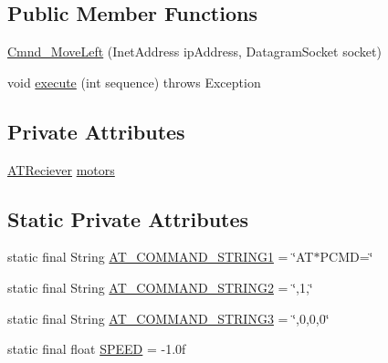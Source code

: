 \subsection*{Public Member Functions}
\begin{DoxyCompactItemize}
\item 
\hyperlink{class_drone_1_1_drone_commands_1_1_cmnd___move_left_a121e1828767507bd3bebaed017e5f4bf}{Cmnd\+\_\+\+Move\+Left} (Inet\+Address ip\+Address, Datagram\+Socket socket)
\item 
void \hyperlink{class_drone_1_1_drone_commands_1_1_cmnd___move_left_afdc1e84570cf60478378f67069e89182}{execute} (int sequence)  throws Exception  	
\end{DoxyCompactItemize}
\subsection*{Private Attributes}
\begin{DoxyCompactItemize}
\item 
\hyperlink{class_drone_1_1_hardware_1_1_a_t_reciever}{A\+T\+Reciever} \hyperlink{class_drone_1_1_drone_commands_1_1_cmnd___move_left_a2492b3f8b7d40f172fcde81705d96547}{motors}
\end{DoxyCompactItemize}
\subsection*{Static Private Attributes}
\begin{DoxyCompactItemize}
\item 
static final String \hyperlink{class_drone_1_1_drone_commands_1_1_cmnd___move_left_a9610e0199cfb7f4bfa27322bebeb87d1}{A\+T\+\_\+\+C\+O\+M\+M\+A\+N\+D\+\_\+\+S\+T\+R\+I\+N\+G1} = \char`\"{}A\+T$\ast$P\+C\+M\+D=\char`\"{}
\item 
static final String \hyperlink{class_drone_1_1_drone_commands_1_1_cmnd___move_left_af2d09d76648f3a83601e0d55568c0fe0}{A\+T\+\_\+\+C\+O\+M\+M\+A\+N\+D\+\_\+\+S\+T\+R\+I\+N\+G2} = \char`\"{},1,\char`\"{}
\item 
static final String \hyperlink{class_drone_1_1_drone_commands_1_1_cmnd___move_left_a9fc3bccd9f3a9ab16e9910d1a4bdabd5}{A\+T\+\_\+\+C\+O\+M\+M\+A\+N\+D\+\_\+\+S\+T\+R\+I\+N\+G3} = \char`\"{},0,0,0\char`\"{}
\item 
static final float \hyperlink{class_drone_1_1_drone_commands_1_1_cmnd___move_left_a93f5514425060c17227e4f883079bf35}{S\+P\+E\+E\+D} = -\/1.\+0f
\end{DoxyCompactItemize}


